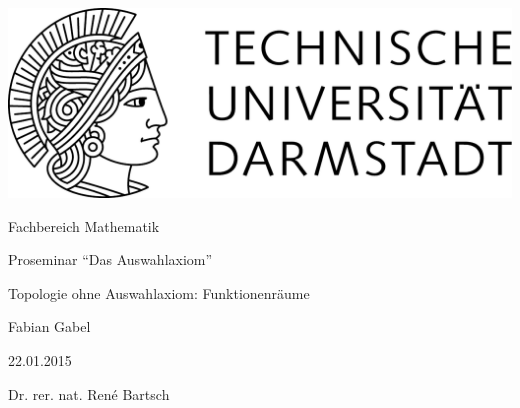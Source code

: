 \begin{titlepage}
  \begin{center}
    \vspace{1cm}
    \includegraphics[width=0.5\linewidth]{TU_Darmstadt_Logo.pdf}
    \vspace{12pt}
    
    \large{Fachbereich Mathematik}
    \vspace{2cm}
    
    \large{Proseminar ``Das Auswahlaxiom''}
    \vspace{2cm}

    \huge{Topologie ohne Auswahlaxiom: Funktionenräume}
    \vspace*{2cm}    
    
		\large
    Fabian Gabel
    \vspace*{.5cm}

    22.01.2015
    \vspace*{1cm}

    Dr. rer. nat. René Bartsch

    \vspace*{.5cm}

  \end{center}
\end{titlepage}
\vspace*{\fill}

